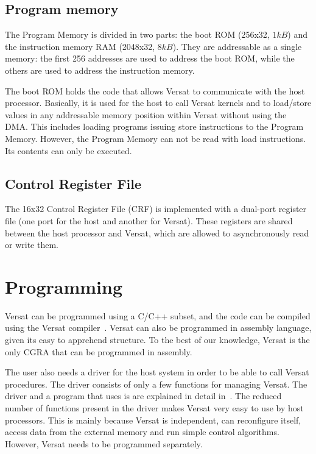 \documentclass[journal]{IEEEtran}
\begin{document}
\subsection{Program memory}
\label{section:programMemory}

The Program Memory is divided in two parts: the boot ROM (256x32,
$1kB$) and the instruction memory RAM (2048x32, $8kB$). They are
addressable as a single memory: the first 256 addresses are used to
address the boot ROM, while the others are used to address the
instruction memory.

The boot ROM holds the code that allows Versat to communicate with the
host processor. Basically, it is used for the host to call Versat
kernels and to load/store values in any addressable memory position
within Versat without using the DMA. This includes loading programs
issuing store instructions to the Program Memory. However, the Program
Memory can not be read with load instructions. Its contents can only
be executed.

\subsection{Control Register File}
\label{section:controlRegisterFile}

The 16x32 Control Register File (CRF) is implemented with a dual-port
register file (one port for the host and another for Versat). These
registers are shared between the host processor and Versat, which are
allowed to asynchronously read or write them.


\section{Programming}

Versat can be programmed using a C/C++ subset, and the code can be
compiled using the Versat compiler~\cite{Santiago2016}. Versat can
also be programmed in assembly language, given its easy to apprehend
structure. To the best of our knowledge, Versat is the only CGRA that
can be programmed in assembly.

The user also needs a driver for the host system in order to be able
to call Versat procedures. The driver consists of only a few functions
for managing Versat. The driver and a program that uses is are
explained in detail in~\cite{Lopes2017}. The reduced number of
functions present in the driver makes Versat very easy to use by host
processors. This is mainly because Versat is independent, can
reconfigure itself, access data from the external memory and run
simple control algorithms. However, Versat needs to be programmed
separately.
\end{document}

